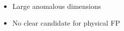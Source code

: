 \documentclass[]{beamer}  %
\begin{document}
\begin{frame}
\begin{enumerate}
\begin{columns}[T]
        \hspace{-20pt}
        \begin{column}{.5\textwidth}
          \begin{center}
            \begin{itemize}
            \item
              Large anomalous dimensions
            \item
              No clear candidate for physical FP
          \end{itemize}
          \end{center}
        \end{column}
      \end{columns}

  \end{enumerate}
\end{frame}


\end{document}
